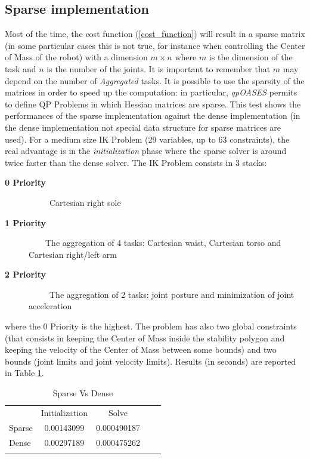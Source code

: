 \subsection{Sparse implementation}
Most of the time, the cost function (\ref{cost_function}) will result in a sparse matrix (in some particular cases this is not true, for instance when controlling the Center of Mass of the robot) with a dimension $m \times n$ where $m$ is the dimension of the task and $n$ is the number of the joints. It is important to remember that $m$ may depend on the number of \emph{Aggregated} tasks. 
It is possible to use the sparsity of the matrices in order to speed up the computation: in particular, \emph{qpOASES} permits to define QP Problems in which Hessian matrices are sparse. This test shows the performances of the sparse implementation against the dense implementation (in the dense implementation not special data structure for sparse matrices are used). For a medium size IK Problem (29 variables, up to 63 constraints), the real advantage is in the \emph{initialization} phase where the sparse solver is around twice faster than the dense solver. The IK Problem consists in 3 stacks: 
\begin{description}
\item[\bf{0 Priority}] \ \ \ \ \ Cartesian right sole 
\item[\bf{1 Priority}] \ \ \ \ The aggregation of 4 tasks: Cartesian waist, Cartesian torso and Cartesian right/left arm 
\item[\bf{2 Priority}] \ \ \ \ \ The aggregation of 2 tasks: joint posture and minimization of joint acceleration 
\end{description}
where the 0 Priority is the highest. The problem has also two global constraints (that consists in keeping the Center of Mass inside the stability polygon and keeping the velocity of the Center of Mass between some bounds) and two bounds (joint limits and joint velocity limits). Results (in seconds) are reported in Table \ref{sparse_vs_dense}.
\begin{table}[!hb]
\centering
\caption{Sparse Vs Dense}
\label{sparse_vs_dense}
\begin{tabular}{lccll}
\cline{2-3}
\multicolumn{1}{l|}{}  & \multicolumn{1}{c|}{Initialization} & \multicolumn{1}{c|}{Solve} &  &  \\ \cline{1-3}
\multicolumn{1}{|l|}{Sparse} & \multicolumn{1}{c|}{0.00143099} & \multicolumn{1}{c|}{0.000490187} &  &  \\ \cline{1-3}
\multicolumn{1}{|l|}{Dense} & \multicolumn{1}{c|}{0.00297189} & \multicolumn{1}{c|}{0.000475262} &  &  \\ \cline{1-3}
                       & \multicolumn{1}{l}{}  & \multicolumn{1}{l}{}  &  & 
\end{tabular}
\end{table}
